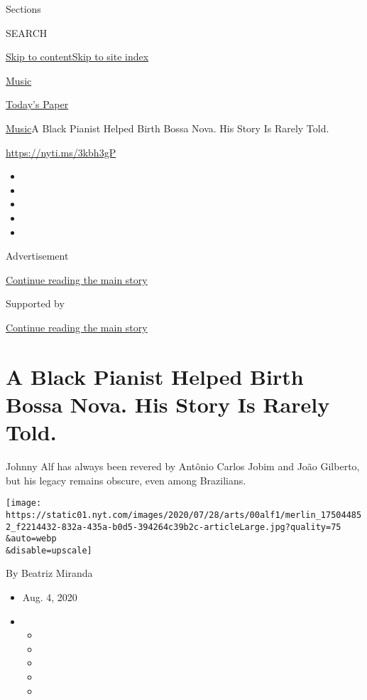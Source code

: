 Sections

SEARCH

\protect\hyperlink{site-content}{Skip to
content}\protect\hyperlink{site-index}{Skip to site index}

\href{https://www.nytimes.com/section/arts/music}{Music}

\href{https://myaccount.nytimes.com/auth/login?response_type=cookie\&client_id=vi}{}

\href{https://www.nytimes.com/section/todayspaper}{Today's Paper}

\href{/section/arts/music}{Music}\textbar{}A Black Pianist Helped Birth
Bossa Nova. His Story Is Rarely Told.

\url{https://nyti.ms/3kbh3gP}

\begin{itemize}
\item
\item
\item
\item
\item
\end{itemize}

Advertisement

\protect\hyperlink{after-top}{Continue reading the main story}

Supported by

\protect\hyperlink{after-sponsor}{Continue reading the main story}

\hypertarget{a-black-pianist-helped-birth-bossa-nova-his-story-is-rarely-told}{%
\section{A Black Pianist Helped Birth Bossa Nova. His Story Is Rarely
Told.}\label{a-black-pianist-helped-birth-bossa-nova-his-story-is-rarely-told}}

Johnny Alf has always been revered by Antônio Carlos Jobim and João
Gilberto, but his legacy remains obscure, even among Brazilians.

\texttt{[image: https://static01.nyt.com/images/2020/07/28/arts/00alf1/merlin\_175044852\_f2214432-832a-435a-b0d5-394264c39b2c-articleLarge.jpg?quality=75\\\&auto=webp\\\&disable=upscale]}

By Beatriz Miranda

\begin{itemize}
\item
  Aug. 4, 2020
\item
  \begin{itemize}
  \item
  \item
  \item
  \item
  \item
  \end{itemize}
\end{itemize}

